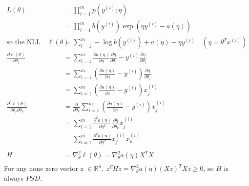 \begin{answer}
    $$
    \begin{aligned}
        L(\theta) &= \prod_{i = 1}^m p(y^{(i)};\eta)\\
        &= \prod_{i = 1}^m b(y^{(i)})\exp(\eta y^{(i)} - a(\eta))\\
        \text{so the NLL} \quad
        \ell(\theta) &= \sum_{i=1}^m -\log{b(y^{(i)})} + a(\eta) - \eta y^{(i)} \quad (\eta = \theta^Tx^{(i)})\\
        \frac{\partial \ell(\theta)}{\partial \theta_j} &= \sum_{i=1}^m \frac{\partial a(\eta)}{\partial \eta}\frac{\partial\eta}{\partial\theta_j}-y^{(i)}\frac{\partial\eta}{\partial\theta_j}\\
        &= \sum_{i=1}^m (\frac{\partial a(\eta)}{\partial \eta}-y^{(i)})\frac{\partial\eta}{\partial\theta_j}\\
        &= \sum_{i=1}^m (\frac{\partial a(\eta)}{\partial \eta}-y^{(i)})x^{(i)}_j\\
        \frac{\partial^2 \ell(\theta)}{\partial \theta_j \partial \theta_k} &= \frac{\partial}{\partial\theta_k}\sum_{i=1}^m (\frac{\partial a(\eta)}{\partial \eta}-y^{(i)})x^{(i)}_j\\
        &= \sum_{i=1}^m \frac{\partial^2 a(\eta)}{\partial \eta^2}\frac{\partial\eta}{\partial\theta_k}x^{(i)}_j\\
        &= \sum_{i=1}^m \frac{\partial^2 a(\eta)}{\partial \eta^2}x^{(i)}_jx^{(i)}_k\\
        \quad \\
        H &= \nabla^2_\theta\ell(\theta) = \nabla^2_\theta a(\eta) X^TX \\
    \end{aligned}
    $$
    For any none zero vector z $\in \mathbb{R}^n,\ z^THz = \nabla^2_\theta a(\eta) (Xz)^TXz \ge 0$, so $H$ is always $PSD$. 
\end{answer}

